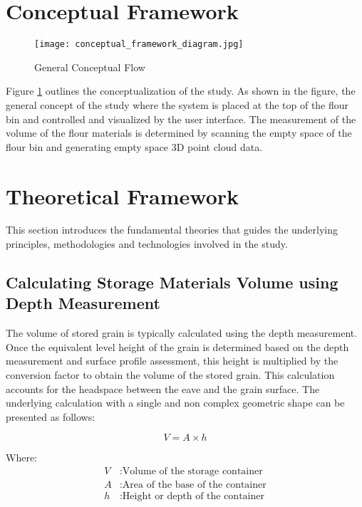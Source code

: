 \section{Conceptual Framework}
\label{intro:sec:Conceptual Framework}

\begin{figure}[H]
	\centering
	\texttt{[image: conceptual\_framework\_diagram.jpg]}
	\caption{General Conceptual Flow}
	\label{fig:conceptual-framework}
\end{figure}

Figure \ref{intro:sec:Conceptual Framework} outlines the conceptualization of the study. As shown in the figure, the general concept of the study where the system is placed at the top of the flour bin and controlled and visualized by the user interface. The measurement of the volume of the flour materials is determined by scanning the empty space of the flour bin and generating empty space 3D point cloud data.

\section{Theoretical Framework}
\label{intro:sec:Theoretical Framework}
This section introduces the fundamental theories that guides the underlying principles, methodologies and technologies involved in the study.

\subsection{Calculating Storage Materials Volume using Depth Measurement}
The volume of stored grain is typically calculated using the depth measurement. Once the equivalent level height of the grain is determined based on the depth measurement and surface profile assessment, this height is multiplied by the conversion factor to obtain the volume of the stored grain. This calculation accounts for the headspace between the eave and the grain surface. The underlying calculation with a single and non complex geometric shape can be presented as follows:

\begin{equation}
	V = A \times h
\end{equation}

Where:
\begin{align*}
	V & : \text{Volume of the storage container}   \\
	A & : \text{Area of the base of the container} \\
	h & : \text{Height or depth of the container}
\end{align*}

